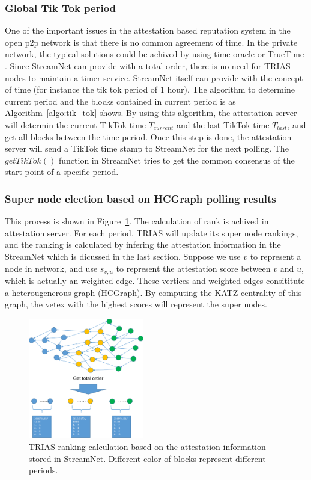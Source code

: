\subsubsection{Global Tik Tok period}
One of the important issues in the attestation based reputation system in the open p2p network is that there is no common agreement of time.
In the private network, the typical solutions could be achived by using time oracle \cite{peng2010large} or TrueTime \cite{corbett2013spanner}.
Since StreamNet can provide with a total order, there is no need for TRIAS nodes to maintain a timer service.
StreamNet itself can provide with the concept of time (for instance the tik tok period of 1 hour).
The algorithm to determine current period and the blocks contained in current period is as Algorithm~\ref{algo:tik_tok} shows.
By using this algorithm, the attestation server will determin the current TikTok time $T_{current}$ and the last TikTok time $T_{last}$, and get all blocks between the time period. 
Once this step is done, the attestation server will send a TikTok time stamp to StreamNet for the next polling.
The $getTikTok()$ function in StreamNet tries to get the common consensus of the start point of a specific period.



\subsubsection{Super node election based on HCGraph polling results}
This process is shown in Figure~\ref{ranking}. The calculation of rank is achived in attestation server.
For each period, TRIAS will update its super node rankings, and the ranking is calculated by infering the attestation information in the StreamNet which is dicussed in the last section.
Suppose we use $v$ to represent a node in network, and use $s_{v,u}$ to represent the attestation score between $v$ and $u$, which is actually an weighted edge.
These vertices and weighted edges consititute a heterougenerous graph (HCGraph). 
By computing the KATZ centrality of this graph, the vetex with the highest scores will represent the super nodes.

\begin{figure}[!ht]
        \begin{center}
                \includegraphics[width=0.45\textwidth]{figures/ranking.pdf}
                \caption{TRIAS ranking calculation based on the attestation information stored in StreamNet. Different color of blocks represent different periods.}
                \label{ranking}
        \end{center}
\end{figure}
